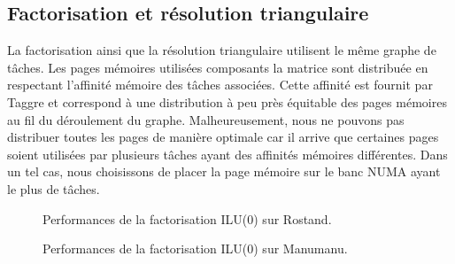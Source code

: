 \subsection{Factorisation et résolution triangulaire}
La factorisation ainsi que la résolution triangulaire utilisent le même graphe de tâches.
%
Les pages mémoires utilisées composants la matrice sont distribuée en respectant l'affinité mémoire des tâches associées.
%
Cette affinité est fournit par Taggre et correspond à une distribution à peu près équitable des pages mémoires au fil du déroulement du graphe.
%
Malheureusement, nous ne pouvons pas distribuer toutes les pages de manière optimale car il arrive que certaines pages soient utilisées par plusieurs tâches ayant des affinités mémoires différentes.
%
Dans un tel cas, nous choisissons de placer la page mémoire sur le banc NUMA ayant le plus de tâches.







\begin{figure}[!h]
     \begin{center}

    \end{center}
    \caption{Performances de la factorisation ILU(0) sur Rostand.}
\end{figure}



\begin{figure}[!h]
     \begin{center}

    \end{center}
    \caption{Performances de la factorisation ILU(0) sur Manumanu.}
\end{figure}


